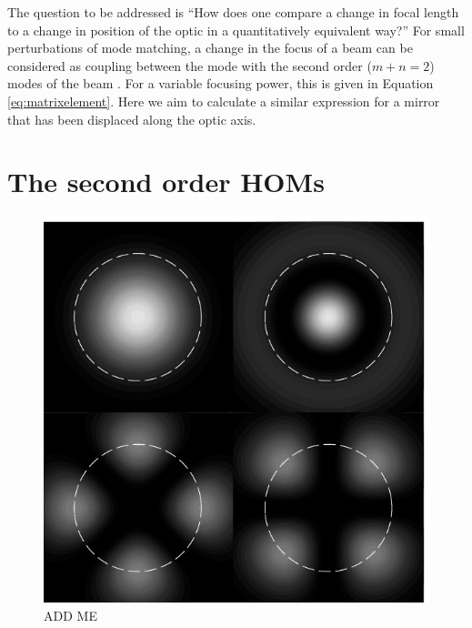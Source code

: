 The question to be addressed is ``How does one compare a change in focal length to a change in position of the optic in a quantitatively equivalent way?'' %
For small perturbations of mode matching, a change in the focus of a beam can be considered as coupling between the  mode with the second order ($m+n=2$) modes of the beam \cite{Anderson1984}. %
For a variable focusing power, this is given in Equation \ref{eq:matrixelement}. %
Here we aim to calculate a similar expression for a mirror  that has been displaced along the optic axis.

\section{The second order HOMs}


\begin{figure}
  \begin{center}
  \leavevmode
  \includegraphics{figs-ap-notes/puresecondordermodes.pdf}
  \end{center}
  \caption[ADD ME]{ADD ME}
  \label{fig:puresecondordermodes}
\end{figure}


